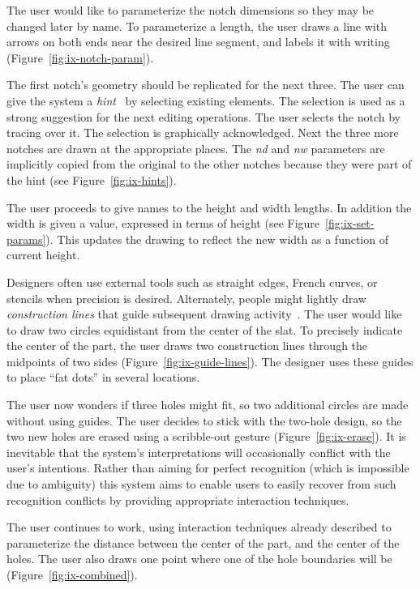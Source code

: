 \documentclass[12pt]{article}
\begin{document}
The user would like to parameterize the notch dimensions so they may be
changed later by name. To parameterize a length, the user draws a line
with arrows on both ends near the desired line segment, and labels it
with writing (Figure~\ref{fig:ix-notch-param}).

The first notch's geometry should be replicated for the next
three. The user can give the system a
\textit{hint}~\cite{mcdaniel-gamut} by selecting existing
elements. The selection is used as a strong suggestion for the next
editing operations. The user selects the notch by tracing over it. The
selection is graphically acknowledged. Next the three more notches are
drawn at the appropriate places. The \textit{nd} and \textit{nw}
parameters are implicitly copied from the original to the other
notches because they were part of the hint (see
Figure~\ref{fig:ix-hints}).

The user proceeds to give names to the height and width lengths. In
addition the width is given a value, expressed in terms of height (see
Figure~\ref{fig:ix-set-params}). This updates the drawing to reflect
the new width as a function of current height.

Designers often use external tools such as straight edges, French
curves, or stencils when precision is desired. Alternately, people
might lightly draw \textit{construction lines} that guide subsequent
drawing activity~\cite{company-sketching-in-engineering}. The user
would like to draw two circles equidistant from the center of the
slat. To precisely indicate the center of the part, the user draws two
construction lines through the midpoints of two sides
(Figure~\ref{fig:ix-guide-lines}). The designer uses these guides
to place ``fat dots'' in several locations.

The user now wonders if three holes might fit, so two additional
circles are made without using guides. The user decides to stick with
the two-hole design, so the two new holes are erased using a
scribble-out gesture (Figure~\ref{fig:ix-erase}). It is inevitable
that the system's interpretations will occasionally conflict with the
user's intentions. Rather than aiming for perfect recognition (which
is impossible due to ambiguity) this system aims to enable users to
easily recover from such recognition conflicts by providing
appropriate interaction techniques.

The user continues to work, using interaction techniques already
described to parameterize the distance between the center of the part,
and the center of the holes. The user also draws one point where one
of the hole boundaries will be (Figure~\ref{fig:ix-combined}).
\end{document}
